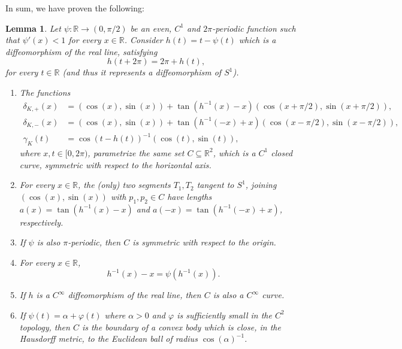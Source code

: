 \documentclass{amsart}
\def \R{\mathbb R}
\newtheorem{lemma}{Lemma}
\begin{document}
In sum, we have proven the following:
\begin{lemma}
	Let $\psi: \R \to (0,\pi/2)$ be an even, $C^1$ and $2\pi$-periodic function such that $\psi'(x) < 1$ for every $x \in \R$.
	Consider $h(t) = t - \psi(t)$ which is a diffeomorphism of the real line, satisfying
	\[h(t+2\pi) = 2\pi + h(t),\]
	for every $t \in \R$ (and thus it represents a diffeomorphism of $S^1$).
	
	\begin{enumerate}[label=(\alph*), ref = \alph* ]
		\item
	The functions
	\begin{align}
        \label{eq_parametrization_h_plus} \delta_{K,+}(x) &= (\cos(x), \sin(x)) +\tan\left(h^{-1}(x) - x\right) (\cos(x+\pi/2), \sin(x+\pi/2)),\\
	\label{eq_parametrization_h_minus} \delta_{K,-}(x) &= (\cos(x), \sin(x)) +\tan\left(h^{-1}(-x) + x\right) (\cos(x-\pi/2), \sin(x-\pi/2)),\\
	\label{eq_parametrization_gamma} \gamma_K(t) &= \cos(t-h(t))^{-1} (\cos(t), \sin(t)),
	\end{align}
	where $x,t \in [0,2\pi)$, parametrize the same set $C \subseteq \R^2$, which is a $C^1$ closed curve, symmetric with respect to the horizontal axis.
	\item
		For every $x \in \R$, the (only) two segments $T_1, T_2$ tangent to $S^1$, joining $(\cos(x), \sin(x))$ with $p_1, p_2 \in C$ have lengths $a(x) = \tan(h^{-1}(x) - x)$ and $a(-x) = \tan(h^{-1}(-x) + x)$, respectively.

		\item
	If $\psi$ is also $\pi$-periodic, then $C$ is symmetric with respect to the origin.

		\item
			For every $x \in \R$,
	\begin{equation}
		\label{eq_relation_a_phi_h}
		h^{-1}(x) - x = \psi(h^{-1}(x)).
	\end{equation}

		\item
	If $h$ is a $C^\infty$ diffeomorphism of the real line, then $C$ is also a $C^\infty$ curve.

		\item
			If $\psi(t) = \alpha + \varphi(t)$ where $\alpha>0$ and $\varphi$ is sufficiently small in the $C^2$ topology, then $C$ is the boundary of a convex body which is close, in the Hausdorff metric, to the Euclidean ball of radius $\cos(\alpha)^{-1}$.
\end{enumerate}
\end{lemma}
\end{document}
